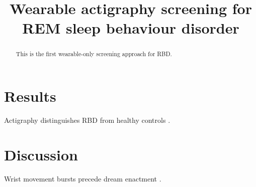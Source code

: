 \documentclass{article}
\title{Wearable actigraphy screening for REM sleep behaviour disorder}
\begin{document}
\maketitle
\begin{abstract}
This is the first wearable-only screening approach for RBD.
\end{abstract}
\section{Results}
Actigraphy distinguishes RBD from healthy controls \cite{smith2019,novak2020}.
\section{Discussion}
Wrist movement bursts precede dream enactment \cite{lee2021}.
\end{document}
